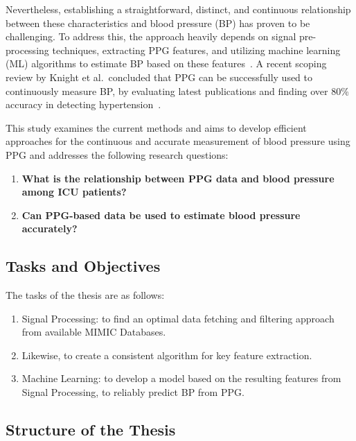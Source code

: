 Nevertheless, establishing a straightforward, distinct, and continuous relationship between these characteristics and blood pressure (BP) has proven to be challenging.
To address this, the approach heavily depends on signal pre-processing techniques, extracting PPG features, and utilizing machine learning (ML) algorithms to estimate BP based on these features~\cite{el-hajjDeepLearningModels2021}.
A recent scoping review by Knight et al.\ concluded that PPG can be successfully used to continuously measure BP, by evaluating latest publications and finding over 80\% accuracy in detecting hypertension~\cite{knightAccuracyWearablePhotoplethysmography2022}.

This study examines the current methods and aims to develop efficient approaches for the continuous and accurate measurement of blood pressure using PPG and addresses the following research questions: 

\begin{enumerate}
\item \textbf{What is the relationship between PPG data and blood pressure among ICU patients?}

\item \textbf{Can PPG-based data be used to estimate blood pressure accurately?}

\end{enumerate}

\subsection{Tasks and Objectives}
\label{subsec:tasks_objectives}

The tasks of the thesis are as follows:

\begin{enumerate}
\item Signal Processing: to find an optimal data fetching and filtering approach from available MIMIC Databases.
\item Likewise, to create a consistent algorithm for key feature extraction.
\item Machine Learning: to develop a model based on the resulting features from Signal Processing, to reliably predict BP from PPG\@.
\end{enumerate}

\subsection{Structure of the Thesis}
\label{subsec:structure}

